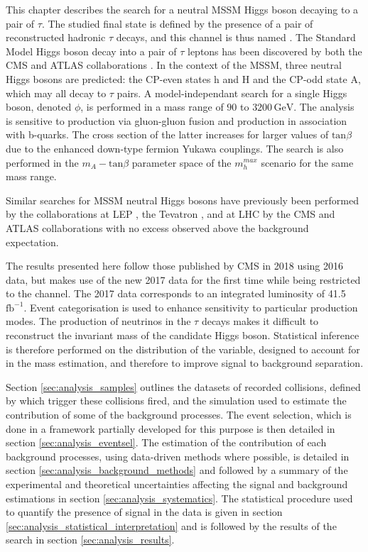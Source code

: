 This chapter describes the search for a neutral MSSM Higgs boson decaying to a pair of $\tau$. The studied final state is defined by the presence of a pair of reconstructed hadronic $\tau$ decays, and this channel is thus named \tauh\tauh. The Standard Model Higgs boson decay into a pair of $\tau$ leptons has been discovered by both the CMS and ATLAS collaborations \cite{ATLASHtt,CMSHtt}. In the context of the MSSM, three neutral Higgs bosons are predicted: the CP-even states h and H and the CP-odd state A, which may all decay to $\tau$ pairs. A model-independant search for a single Higgs boson, denoted $\phi$, is performed in a mass range of $90$ to $3200\,\mathrm{GeV}$. The analysis is sensitive to production via gluon-gluon fusion and production in association with b-quarks. The cross section of the latter increases for larger values of $\mathrm{tan}\beta$ due to the enhanced down-type fermion Yukawa couplings.  The search is also performed in the $m_A - \mathrm{tan}\beta$ parameter space of the $m_{h}^{max}$ scenario \cite{Carena2003} for the same mass range.

Similar searches for MSSM neutral Higgs bosons have previously been performed by the collaborations at LEP \cite{Schael2006}, the Tevatron \cite{Benjamin:2010xb}, and at LHC by the CMS and ATLAS collaborations \cite{Aaboud2018,Sirunyan2018} with no excess observed above the background expectation. 

The results presented here follow those published by CMS in 2018 using 2016 data, but makes use of the new 2017 data for the first time while being restricted to the \tauh\tauh channel. The 2017 data corresponds to an integrated luminosity of 41.5 $\mathrm{fb^{-1}}$. Event categorisation is used to enhance sensitivity to particular production modes. The production of neutrinos in the $\tau$ decays makes it difficult to reconstruct the invariant mass of the candidate Higgs boson. Statistical inference is therefore performed on the distribution of the \mttot variable, designed to account for \MET in the mass estimation, and therefore to improve signal to background separation.

Section \ref{sec:analysis_samples} outlines the datasets of recorded collisions, defined by which trigger these collisions fired, and the simulation used to estimate the contribution of some of the background processes. The event selection, which is done in a framework partially developed for this purpose is then detailed in section \ref{sec:analysis_eventsel}. The estimation of the contribution of each background processes, using data-driven methods where possible, is detailed in section \ref{sec:analysis_background_methods} and followed by a summary of the experimental and theoretical uncertainties affecting the signal and background estimations in section \ref{sec:analysis_systematics}. The statistical procedure used to quantify the presence of signal in the data is given in section \ref{sec:analysis_statistical_interpretation} and is followed by the results of the search in section \ref{sec:analysis_results}.

